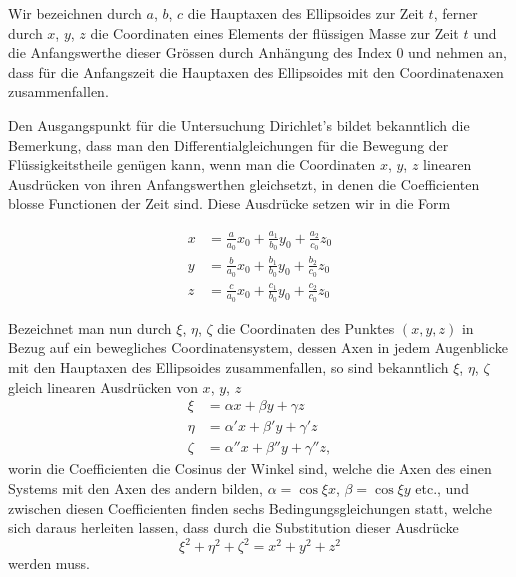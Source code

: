 \documentclass[12pt,a4paper]{article}
\begin{document}
Wir bezeichnen durch $a$, $b$, $c$ die Hauptaxen des Ellipsoides zur Zeit $t$, ferner durch $x$, $y$, $z$ die Coordinaten eines Elements der fl\"ussigen Masse zur Zeit $t$ und die Anfangswerthe dieser Gr\"ossen durch Anh\"angung des Index $0$ und nehmen an, dass f\"ur die Anfangszeit die Hauptaxen des Ellipsoides mit den Coordinatenaxen zusammenfallen.

Den Ausgangspunkt f\"ur die Untersuchung Dirichlet's bildet bekanntlich die Bemerkung, dass man den Differentialgleichungen f\"ur die Bewegung der Fl\"ussigkeitstheile gen\"ugen kann, wenn man die Coordinaten $x$, $y$, $z$ linearen Ausdr\"ucken von ihren Anfangswerthen gleichsetzt, in denen die Coefficienten blosse Functionen der Zeit sind. Diese Ausdr\"ucke setzen wir in die Form

\begin{align*}
x &= \frac{a}{a_{0}}x_{0} + \frac{a_{1}}{b_{0}}y_{0} + \frac{a_{2}}{c_{0}}z_{0}\\
y &= \frac{b}{a_{0}}x_{0} + \frac{b_{1}}{b_{0}}y_{0} + \frac{b_{2}}{c_{0}}z_{0}\\
z &= \frac{c}{a_{0}}x_{0} + \frac{c_{1}}{b_{0}}y_{0} + \frac{c_{2}}{c_{0}}z_{0}\tag{1}
\end{align*}

Bezeichnet man nun durch $\xi$, $\eta$, $\zeta$ die Coordinaten des Punktes $(x,y,z)$ in Bezug auf ein bewegliches Coordinatensystem, dessen Axen in jedem Augenblicke mit den Hauptaxen des Ellipsoides zusammenfallen, so sind bekanntlich $\xi$, $\eta$, $\zeta$ gleich linearen Ausdr\"ucken von $x$, $y$, $z$
\begin{align*}
\xi &= \alpha x + \beta y + \gamma z\\
\eta &= \alpha' x + \beta' y + \gamma' z\\
\zeta &= \alpha'' x + \beta'' y + \gamma'' z,\tag{2}
\end{align*}
worin die Coefficienten die Cosinus der Winkel sind, welche die Axen des einen Systems mit den Axen des andern bilden, $\alpha = \cos\xi x$, $\beta = \cos\xi y$ etc., und zwischen diesen Coefficienten finden sechs Bedingungsgleichungen statt, welche sich daraus herleiten lassen, dass durch die Substitution dieser Ausdr\"ucke
\[
\xi^{2} + \eta^{2} + \zeta^{2} = x^{2} + y^{2} + z^{2}
\]
werden muss.
\end{document}
